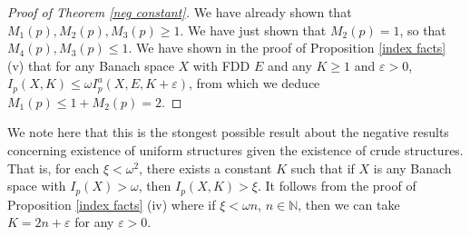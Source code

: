 \documentclass[12pt]{amsart}
\theoremstyle{definition}
\newcommand{\nn}{\mathbb{N}}
\begin{document}
\begin{proof}[Proof of Theorem \ref{neg constant}] We have already shown that $M_1(p), M_2(p), M_3(p)\geqslant 1$.   We have just shown that $M_2(p)=1$, so that $M_4(p),M_3(p)\leqslant 1$.  We have shown in the proof of Proposition \ref{index facts} (v) that for any Banach space $X$ with FDD $E$ and any $K\geqslant 1$ and $\varepsilon>0$, $I_p(X,K)\leqslant \omega I_p^a(X,E, K+\varepsilon)$, from which we deduce $M_1(p)\leqslant 1+M_2(p)=2$.  



\end{proof}

We note here that this is the stongest possible result about the negative results concerning existence of uniform structures given the existence of crude structures.  That is, for each $\xi<\omega^2$, there exists a constant $K$ such that if $X$ is any Banach space with $I_p(X)>\omega$, then $I_p(X, K)>\xi$.  It follows from the proof of Proposition \ref{index facts} (iv) where if $\xi<\omega n$, $n\in \nn$, then we can take $K=2n+\varepsilon$ for any $\varepsilon>0$.  
\end{document}

